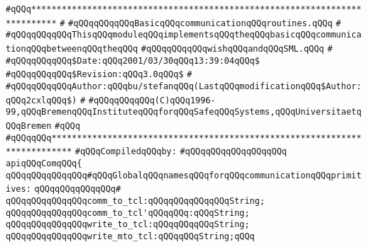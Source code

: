 \label{src/lib/tk/src/com.api}
\verb|#qQQq***************************************************************************|\newline
\verb|#|\newline
\verb|#qQQqqQQqqQQqBasicqQQqcommunicationqQQqroutines.qQQq|\newline
\verb|#|\newline
\verb|#qQQqqQQqqQQqThisqQQqmoduleqQQqimplementsqQQqtheqQQqbasicqQQqcommunicationqQQqbetweenqQQqtheqQQq|\newline
\verb|#qQQqqQQqqQQqwishqQQqandqQQqSML.qQQq|\newline
\verb|#|\newline
\verb|#qQQqqQQqqQQq$Date:qQQq2001/03/30qQQq13:39:04qQQq$|\newline
\verb|#qQQqqQQqqQQq$Revision:qQQq3.0qQQq$|\newline
\verb|#|\newline
\verb|#qQQqqQQqqQQqAuthor:qQQqbu/stefanqQQq(LastqQQqmodificationqQQq$Author:qQQq2cxlqQQq$)|\newline
\verb|#|\newline
\verb|#qQQqqQQqqQQq(C)qQQq1996-99,qQQqBremenqQQqInstituteqQQqforqQQqSafeqQQqSystems,qQQqUniversitaetqQQqBremen|\newline
\verb|#qQQq|\newline
\verb|#qQQqqQQq**************************************************************************|\newline
\newline
\verb|#qQQqCompiledqQQqby:|\newline
\verb|#qQQqqQQqqQQqqQQqqQQq|\newline
\newline
\verb|apiqQQqComqQQq{|\newline
\newline
\verb|qQQqqQQqqQQqqQQq#qQQqGlobalqQQqnamesqQQqforqQQqcommunicationqQQqprimitives:|\newline
\verb|qQQqqQQqqQQqqQQq#|\newline
\verb|qQQqqQQqqQQqqQQqcomm_to_tcl:qQQqqQQqqQQqqQQqString;|\newline
\verb|qQQqqQQqqQQqqQQqcomm_to_tcl'qQQqqQQq:qQQqString;|\newline
\verb|qQQqqQQqqQQqqQQqwrite_to_tcl:qQQqqQQqqQQqString;|\newline
\verb|qQQqqQQqqQQqqQQqwrite_mto_tcl:qQQqqQQqString;qQQq|\newline
\newline
